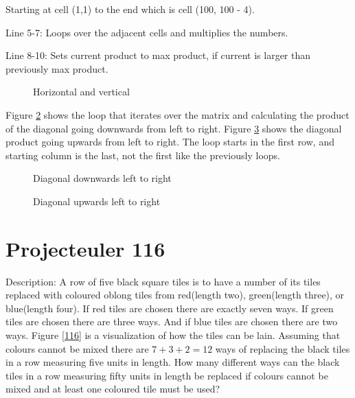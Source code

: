 \documentclass[a4paper,11pt]{article}
\begin{document}
\begin{list}{}{}
	\item Starting at cell (1,1) to the end which is cell (100, 100 - 4).
	\item Line 5-7: Loops over the adjacent cells and multiplies the numbers.
	\item Line 8-10: Sets current product to max product, if current is larger than previously max product.
\end{list}
\begin{figure}[H]
	\begin{center}
		
		\caption{Horizontal and vertical}
		\label{111}
	\end{center}
\end{figure}
Figure \ref{112} shows the loop that iterates over the matrix and calculating the product of the diagonal going downwards from left to right. Figure \ref{113} shows the diagonal product going upwards from left to right. The loop starts in the first row, and starting column is the last, not the first like the previously loops.
\begin{figure}[H]
	\begin{center}
		
		\caption{Diagonal downwards left to right}
		\label{112}
	\end{center}
\end{figure}
\begin{figure}[H]
	\begin{center}
		
		\caption{Diagonal upwards left to right}
		\label{113}
	\end{center}
\end{figure}

\section{Projecteuler 116}
Description: A row of five black square tiles is to have a number of its tiles replaced with coloured oblong tiles from red(length two), green(length three), or blue(length four). If red tiles are chosen there are exactly seven ways. If green tiles are chosen there are three ways. And if blue tiles are chosen there are two ways. Figure \ref{116} is a visualization of how the tiles can be lain. Assuming that colours cannot be mixed there are $7+3+2=12$ ways of replacing the black tiles in a row measuring five units in length. How many different ways can the black tiles in a row measuring fifty units in length be replaced if colours cannot be mixed and at least one coloured tile must be used?
\end{document}
